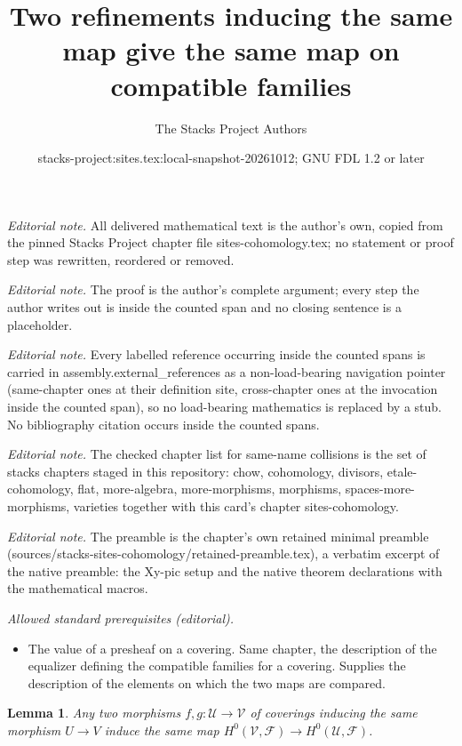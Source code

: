 \documentclass[10pt,a4paper]{amsart}
\title{Two refinements inducing the same map give the same map on compatible families}
\author{The Stacks Project Authors}
\date{stacks-project:sites.tex:local-snapshot-20261012; GNU FDL 1.2 or later}
\theoremstyle{plain}
\newtheorem{lemma}[subsection]{Lemma}
\theoremstyle{definition}
\theoremstyle{remark}
\numberwithin{equation}{subsection}
\begin{document}
\maketitle
\noindent\textit{Editorial note.} All delivered mathematical text is the author's own, copied from the pinned Stacks Project chapter file sites-cohomology.tex; no statement or proof step was rewritten, reordered or removed.\par\medskip
\noindent\textit{Editorial note.} The proof is the author's complete argument; every step the author writes out is inside the counted span and no closing sentence is a placeholder.\par\medskip
\noindent\textit{Editorial note.} Every labelled reference occurring inside the counted spans is carried in assembly.external\_references as a non-load-bearing navigation pointer (same-chapter ones at their definition site, cross-chapter ones at the invocation inside the counted span), so no load-bearing mathematics is replaced by a stub. No bibliography citation occurs inside the counted spans.\par\medskip
\noindent\textit{Editorial note.} The checked chapter list for same-name collisions is the set of stacks chapters staged in this repository: chow, cohomology, divisors, etale-cohomology, flat, more-algebra, more-morphisms, morphisms, spaces-more-morphisms, varieties together with this card's chapter sites-cohomology.\par\medskip
\noindent\textit{Editorial note.} The preamble is the chapter's own retained minimal preamble (sources/stacks-sites-cohomology/retained-preamble.tex), a verbatim excerpt of the native preamble: the Xy-pic setup and the native theorem declarations with the mathematical macros.\par\medskip
\noindent\textit{Allowed standard prerequisites (editorial).}\begin{itemize}
\item The value of a presheaf on a covering. Same chapter, the description of the equalizer defining the compatible families for a covering. Supplies the description of the elements on which the two maps are compared.
\end{itemize}\medskip
\begin{lemma}
\label{lemma-independent-refinement}
Any two morphisms $f, g: \mathcal{U} \to \mathcal{V}$ of coverings
inducing the same morphism $U \to V$ induce the same
map $H^0(\mathcal{V}, \mathcal{F}) \to  H^0(\mathcal{U}, \mathcal{F})$.
\end{lemma}
\end{document}
